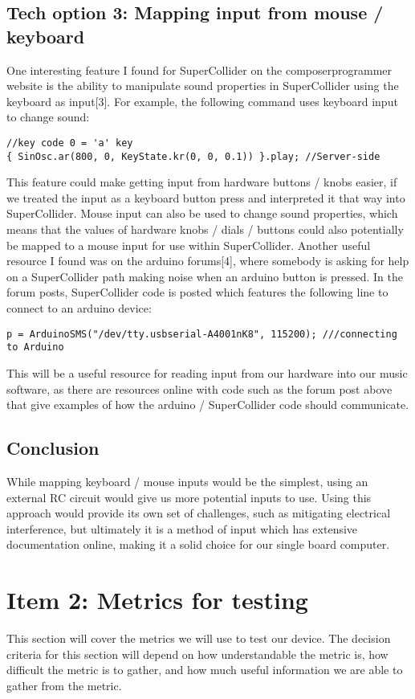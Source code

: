 \documentclass{article}
\begin{document}
\subsection{Tech option 3: Mapping input from mouse / keyboard}
One interesting feature I found for SuperCollider on the composerprogrammer website is the ability to manipulate sound properties in SuperCollider using the keyboard as input[3]. For example, the following command uses keyboard input to change sound:
\begin{verbatim}
//key code 0 = 'a' key
{ SinOsc.ar(800, 0, KeyState.kr(0, 0, 0.1)) }.play; //Server-side 
\end{verbatim}
This feature could make getting input from hardware buttons / knobs easier, if we treated the input as a keyboard button press and interpreted it that way into SuperCollider. Mouse input can also be used to change sound properties, which means that the values of hardware knobs / dials / buttons could also potentially be mapped to a mouse input for use within SuperCollider.   
Another useful resource I found was on the arduino forums[4], where somebody is asking for help on a SuperCollider path making noise when an arduino button is pressed. In the forum posts, SuperCollider code is posted which features the following line to connect to an arduino device:
\begin{verbatim}
p = ArduinoSMS("/dev/tty.usbserial-A4001nK8", 115200); ///connecting to Arduino
\end{verbatim}
This will be a useful resource for reading input from our hardware into our music software, as there are resources online with code such as the forum post above that give examples of how the arduino / SuperCollider code should communicate. 

\subsection{Conclusion} While mapping keyboard / mouse inputs would be the simplest, using an external RC circuit would give us more potential inputs to use. Using this approach would provide its own set of challenges, such as mitigating electrical interference, but ultimately it is a method of input which has extensive documentation online, making it a solid choice for our single board computer.

\section{Item 2: Metrics for testing} 
This section will cover the metrics we will use to test our device. The decision criteria for this section will depend on how understandable the metric is, how difficult the metric is to gather, and how much useful information we are able to gather from the metric.
\end{document}
